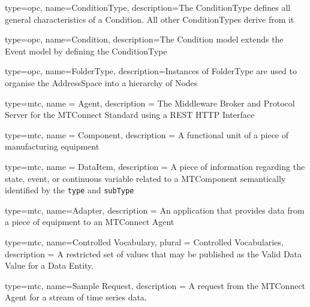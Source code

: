 {
    type=opc,
    name=ConditionType,
    description={The ConditionType defines all general characteristics of a Condition. All other ConditionTypes derive from it}
}

{
    type=opc,
    name=Condition,
    description={The Condition model extends the Event model by defining the ConditionType}
}

{
    type=opc,
    name=FolderType,
    description={Instances of FolderType are used to organise the AddressSpace into a hierarchy of Nodes}
}




{
  type=mtc,
  name = {Agent},
  description = {The Middleware Broker and Protocol Server for the MTConnect Standard using a REST HTTP Interface}
}

{
  type=mtc,
  name = Component,
  description = {A functional unit of a piece of manufacturing equipment}
}

{
  type=mtc,
  name = DataItem,
  description = {A piece of information regarding the state, event, or continuous variable related to a \gls{MTComponent} semantically identified by the \texttt{type} and \texttt{subType}}
}

{
  type=mtc,
  name=Adapter,
  description = {An application that provides data from a piece of equipment to an MTConnect Agent}
}

{
  type=mtc,
  name={Controlled Vocabulary},
  plural = {Controlled Vocabularies},
  description = {A restricted set of values that may be published as the Valid Data Value for a Data Entity.}
}

{
  type=mtc,
  name={Sample Request},
  description = {A request from the MTConnect \gls{Agent} for a stream of time series data.}
}

